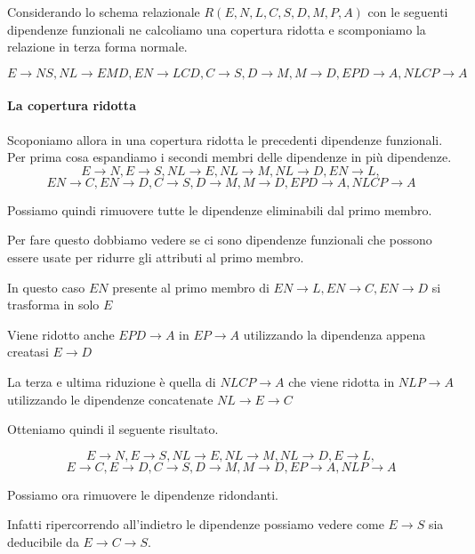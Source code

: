 \begin{exmp}
    Considerando lo schema relazionale $R(E,N,L,C,S,D,M,P,A)$ con le seguenti dipendenze funzionali ne calcoliamo una copertura ridotta e scomponiamo la relazione in terza forma normale.

    \[E \rightarrow NS, NL \rightarrow EMD, EN \rightarrow LCD, C \rightarrow S, D \rightarrow M, M \rightarrow D, EPD \rightarrow A, NLCP \rightarrow A\]

    \paragraph{La copertura ridotta}
    Scoponiamo allora in una copertura ridotta le precedenti dipendenze funzionali. Per prima cosa espandiamo i secondi membri delle dipendenze in più dipendenze.
    \[
    E \rightarrow N,
    E \rightarrow S,
    NL \rightarrow E,
    NL \rightarrow M,
    NL \rightarrow D,
    EN \rightarrow L,
    \]
    \[
    EN \rightarrow C,
    EN \rightarrow D,
    C \rightarrow S,
    D \rightarrow M,
    M \rightarrow D,
    EPD \rightarrow A,
    NLCP \rightarrow A
    \]

    Possiamo quindi rimuovere tutte le dipendenze eliminabili dal primo membro.

    Per fare questo dobbiamo vedere se ci sono dipendenze funzionali che possono essere usate per ridurre gli attributi al primo membro.

    In questo caso $EN$ presente al primo membro di $ EN \rightarrow L,
    EN \rightarrow C,
    EN \rightarrow D$ si trasforma in solo $E$

    Viene ridotto anche $EPD \rightarrow A $ in $ EP \rightarrow A$ utilizzando la dipendenza appena creatasi $E \rightarrow D$

    La terza e ultima riduzione è quella di $ NLCP \rightarrow A$ che viene ridotta in $NLP \rightarrow A $ utilizzando le dipendenze concatenate $NL \rightarrow E \rightarrow C$ 

    Otteniamo quindi il seguente risultato.

    \[
    E \rightarrow N,
    E \rightarrow S,
    NL \rightarrow E,
    NL \rightarrow M,
    NL \rightarrow D,
    E \rightarrow L,
    \]
    \[
    E \rightarrow C,
    E \rightarrow D,
    C \rightarrow S,
    D \rightarrow M,
    M \rightarrow D,
    EP \rightarrow A,
    NLP \rightarrow A
    \]

    Possiamo ora rimuovere le dipendenze ridondanti.

    Infatti ripercorrendo all'indietro le dipendenze possiamo vedere come $E \rightarrow S$ sia deducibile da $E \rightarrow C  \rightarrow S$.


\end{exmp}
